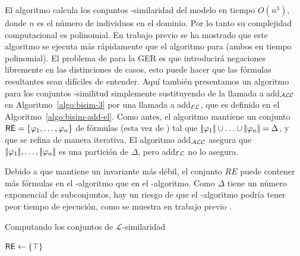 El algoritmo \alc calcula los conjuntos \alc-similaridad del modelo en
tiempo $O(n^3)$, donde $ n $ es el n\'umero de individuos en el dominio. 
Por lo tanto su complejidad computacional es polinomial. En trabajo previo \cite{areces08} se ha mostrado que este algoritmo se ejecuta m\'as r\'apidamente que el algoritmo para \EL (ambos en tiempo polinomial).
El problema de \alc para la GER es que introducir\'a negaciones libremente en las distinciones de casos, esto
puede hacer que las f\'ormulas resultantes sean dif\'iciles de entender. 
Aqu\'i tambi\'en
presentamos un algoritmo para los conjuntos \el-similitud simplemente sustituyendo de la llamada a add$_{\mathcal{ALC}} $ en
Algoritmo~\ref{algo:bisim-3} por una llamada a add$_{\mathcal{EL}} $, que es
definido en el Algoritmo~\ref{algo:bisim-add-el}. Como antes, el
algoritmo mantiene un conjunto $\textsf{RE} = \{\varphi_1,\ldots,\varphi_n\}$ de
f\'ormulas (esta vez de \el) tal que $|\!|\varphi_1|\!| \cup \ldots
\cup |\!|\varphi_n|\!| = \Delta$, y que se refina de manera iterativa.
El algoritmo add$_{\mathcal{ALC}}$ asegura que
$|\!|\varphi_1|\!|,\ldots,|\!|\varphi_n|\!|$ es una partici\'on de
$ \Delta $, pero add$_{\mathcal{EL}}$ no lo asegura.

Debido a que mantiene un invariante m\'as d\'ebil, el conjunto $RE$ puede contener
m\'as f\'ormulas en el \el-algoritmo que en el \alc-algoritmo. Como $ \Delta $ tiene un n\'umero exponencial de subconjuntos,
hay un riesgo de que el \el-algoritmo podr\'ia tener peor tiempo de ejecuci\'on, como se muestra en trabajo previo \cite{areces08}.\\

 
\begin{algorithm}[H]
\dontprintsemicolon
\caption{Computando los conjuntos de $\mathcal{L}$-similaridad}
\label{algo:bisim-3}

$\textsf{RE} \leftarrow \{\top\}$


\end{algorithm}

